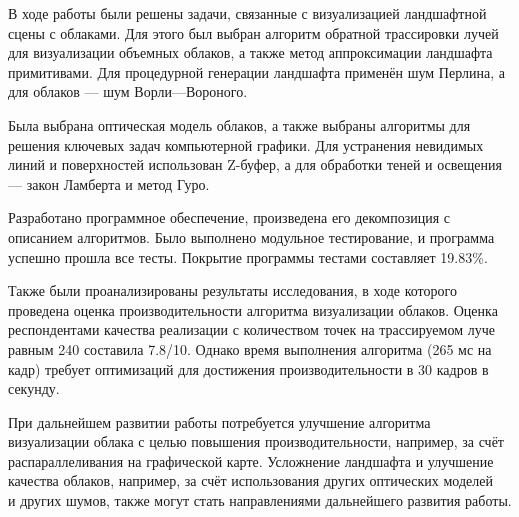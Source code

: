 
В ходе работы были решены задачи, связанные с визуализацией ландшафтной сцены с облаками. Для этого был выбран алгоритм обратной трассировки лучей для визуализации объемных облаков, а также метод аппроксимации ландшафта примитивами. Для процедурной генерации ландшафта применён шум Перлина, а для облаков — шум Ворли--–Вороного.

Была выбрана оптическая модель облаков, а также выбраны алгоритмы для решения ключевых задач компьютерной графики. Для устранения невидимых линий и поверхностей использован Z-буфер, а для обработки теней и освещения — закон Ламберта и метод Гуро.

Разработано программное обеспечение, произведена его декомпозиция с описанием алгоритмов. Было выполнено модульное тестирование, и программа успешно прошла все тесты. Покрытие программы тестами составляет 19.83\%.

Также были проанализированы результаты исследования, в ходе которого проведена оценка производительности алгоритма визуализации облаков. Оценка респондентами качества реализации с количеством точек на трассируемом луче равным 240 составила 7.8/10. Однако время выполнения алгоритма (265 мс на кадр) требует оптимизаций для достижения производительности в 30 кадров в секунду.

При дальнейшем развитии работы потребуется улучшение алгоритма визуализации облака с целью повышения производительности, например, за счёт распараллеливания на графической карте. Усложнение ландшафта и улучшение качества облаков, например, за счёт использования других оптических моделей~\cite{guerrilla_volumetric_cloudscapes_2023} и других шумов, также могут стать направлениями дальнейшего развития работы.